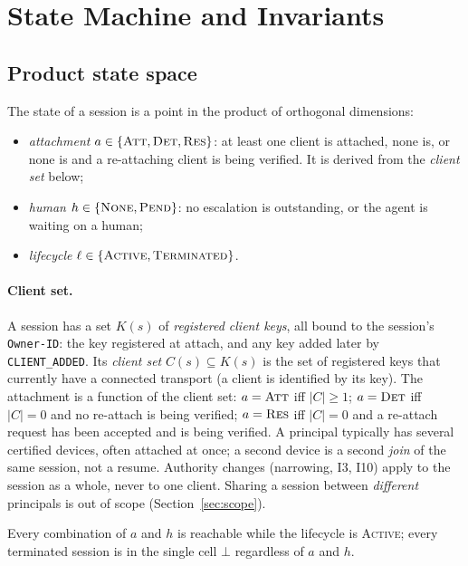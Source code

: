 \section{State Machine and Invariants}
\label{sec:state-machine}

\subsection{Product state space}\label{sec:product-model}

The state of a session is a point in the product of orthogonal
dimensions:
\begin{itemize}[leftmargin=2em]
\item \emph{attachment} $a \in \{\textsc{Att}, \textsc{Det},
\textsc{Res}\}$: at least one client is attached, none is, or none is
and a re-attaching client is being verified. It is derived from the
\emph{client set} below;
\item \emph{human} $h \in \{\textsc{None}, \textsc{Pend}\}$: no
escalation is outstanding, or the agent is waiting on a human;
\item \emph{lifecycle} $\ell \in \{\textsc{Active},
\textsc{Terminated}\}$.
\end{itemize}
\paragraph{Client set.} A session has a set $K(s)$ of \emph{registered
client keys}, all bound to the session's \texttt{Owner-ID}: the key
registered at attach, and any key added later by \texttt{CLIENT\_ADDED}.
Its \emph{client set} $C(s) \subseteq K(s)$ is the set of registered keys
that currently have a connected transport (a client is identified by its
key). The attachment is a function of the client set:
$a=\textsc{Att}$ iff $|C| \geq 1$; $a=\textsc{Det}$ iff $|C| = 0$ and
no re-attach is being verified; $a=\textsc{Res}$ iff $|C| = 0$ and a
re-attach request has been accepted and is being verified. A principal
typically has several certified devices, often attached at once;
a second device is a second \emph{join} of the same session, not a
resume. Authority changes (narrowing, I3, I10) apply to the session as a
whole, never to one client. Sharing a session between \emph{different}
principals is out of scope (Section~\ref{sec:scope}).

Every combination of $a$ and $h$ is reachable while the lifecycle is
\textsc{Active}; every terminated session is in the single cell
$\bot$ regardless of $a$ and $h$.

